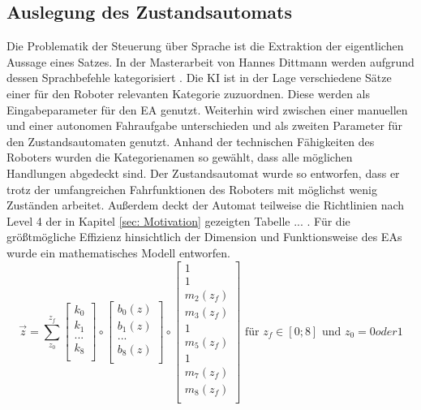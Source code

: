 	\subsection{Auslegung des Zustandsautomats}
	Die Problematik der Steuerung über Sprache ist die Extraktion der eigentlichen Aussage eines Satzes. In der Masterarbeit von Hannes Dittmann werden aufgrund dessen Sprachbefehle kategorisiert \cite{Dittmann}. Die KI ist in der Lage verschiedene Sätze einer für den Roboter relevanten Kategorie zuzuordnen. Diese werden als Eingabeparameter für den EA genutzt. Weiterhin wird zwischen einer manuellen und einer autonomen Fahraufgabe unterschieden und als zweiten Parameter für den Zustandsautomaten genutzt. Anhand der technischen Fähigkeiten des Roboters wurden die Kategorienamen so gewählt, dass alle möglichen Handlungen abgedeckt sind. Der Zustandsautomat wurde so entworfen, dass er trotz der umfangreichen Fahrfunktionen des Roboters mit möglichst wenig Zuständen arbeitet. Außerdem deckt der Automat teilweise die Richtlinien nach Level 4 der in Kapitel \ref{sec: Motivation} gezeigten Tabelle ... . Für die größtmögliche Effizienz hinsichtlich der Dimension und Funktionsweise des EAs wurde ein mathematisches Modell entworfen.\\
	
	\begin{equation}
	\vec{z}=\sum_{z_0}^{z_f} \left[ \begin{array}{r}
	k_0  \\
	k_{1}  \\
	...  \\
	k_8  \\
	\end{array}\right] \circ
	\left[ \begin{array}{r}
	b_0(z)  \\
	b_{1}(z)  \\
	...  \\
	b_8(z)  \\
	\end{array}\right]  \circ
	\left[ \begin{array}{r}
	1  \\
	1  \\
	m_{2}(z_f)  \\
	m_{3}(z_f)   \\
	1  \\
	m_{5}(z_f)  \\
	1   \\
	m_{7}(z_f)   \\
	m_8(z_f)  \\
	\end{array}\right]
	\text{ für }z_f\in[0;8] \text{ und }z_0=0 oder 1
	\label{eq: statemachine}
	\end{equation}\\
	
